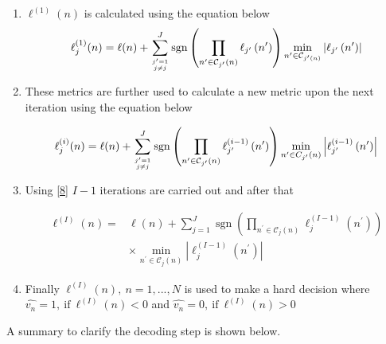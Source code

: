 \documentclass[11pt, oneside, dvipdfmx]{book}
\begin{document}
\begin{enumerate}
\item $\ell^{(1)}(n)$ is calculated using the equation below
\begin{equation}
\ell_{j}^{(1)}(n)=\ell(n)+\sum_{j^{\prime}=1 \atop j \neq j}^{J} \operatorname{sgn}\left(\prod_{n^{\prime} \in \mathcal{C}_{j^{\prime}}(n)} \ell_{j^{\prime}}\left(n^{\prime}\right)\right) \min _{n^{\prime} \in \mathcal{C}_{j^{\prime}(n)}}\left|\ell_{j^{\prime}}\left(n^{\prime}\right)\right|
\label{7}
\end{equation}

\item These metrics are further used to calculate a new metric upon the next iteration using the equation below

\begin{equation}
\ell_{j}^{(i)}(n)=\ell(n)+\sum_{j^{\prime}=1 \atop j \neq j}^{J} \operatorname{sgn}\left(\prod_{n^{\prime} \in \mathcal{C}_{j^{\prime}}(n)} \ell_{j^{\prime}}^{(i-1)}\left(n^{\prime}\right)\right) \min _{n^{\prime} \in C_{j^{\prime}}(n)}\left|\ell_{j^{\prime}}^{(i-1)}\left(n^{\prime}\right)\right|
\label{8}
\end{equation}

\item Using \ref{8} $I-1$ iterations are carried out and after that 

\begin{equation}
\begin{aligned} \ell^{(I)}(n)=& \ell(n)+\sum_{j=1}^{J} \operatorname{sgn}\left(\prod_{n^{\prime} \in \mathcal{C}_{j}(n)} \ell_{j}^{(I-1)}\left(n^{\prime}\right)\right)\\ & \times \min _{n^{\prime} \in \mathcal{C}_{j}(n)}\left|\ell_{j}^{(I-1)}\left(n^{\prime}\right)\right| \end{aligned}
\label{9}
\end{equation}

\item Finally $ \ell^{(I)}(n),~n=1,...,N$ is used to make a hard decision where $\hat{v_n}=1, ~\text{if}~\ell^{(I)}(n)<0$ and $\hat{v_n}=0, ~\text{if}~\ell^{(I)}(n)>0$
\end{enumerate}

A summary to clarify the decoding step is shown below.
\end{document}
